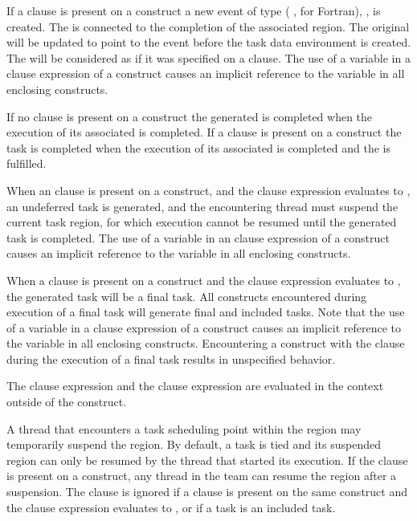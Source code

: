 If a  clause is present on a  construct a new event 
of type  ( , for Fortran), 
, is created. The  is 
connected to the completion of the associated  region. The original 
 will be updated to point to the 
event before the task data environment is created. The  will 
be considered as if it was specified on a  clause.  
The use of a variable in a  clause expression of a  
construct causes an implicit reference to the variable in all enclosing constructs.

If no  clause is present on a  construct the generated  is completed when the execution of its associated  is completed. If a  clause is present on a  construct the task is completed when the execution of its associated  is completed and the  is fulfilled.

When an  clause is present on a  construct, and the  clause expression
evaluates to , an undeferred task is generated, and the encountering thread must
suspend the current task region, for which execution cannot be resumed until the
generated task is completed. The use of a variable in an  clause expression
of a  construct causes an implicit reference to the variable in all enclosing
constructs.

When a  clause is present on a  construct and the  clause expression
evaluates to , the generated task will be a final task. All  constructs
encountered during execution of a final task will generate final and included tasks. Note
that the use of a variable in a  clause expression of a  construct causes an
implicit reference to the variable in all enclosing constructs. Encountering a  construct with the  clause
during the execution of a final task results in unspecified behavior.

The  clause expression and the  clause expression are evaluated in the context
outside of the  construct.

A thread that encounters a task scheduling point within the  region may
temporarily suspend the  region. By default, a task is tied and its suspended 
region can only be resumed by the thread that started its execution. If the 
clause is present on a  construct, any thread in the team can resume the 
region after a suspension. The  clause is ignored if a  clause is present
on the same  construct and the  clause expression evaluates to , or if a
task is an included task.

